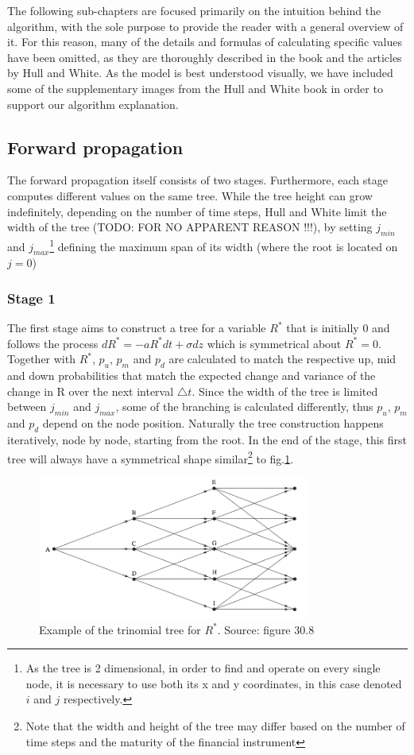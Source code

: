 The following sub-chapters are focused primarily on the intuition behind the algorithm, with the sole purpose to provide the reader with a general overview of it. For this reason, many of the details and formulas of calculating specific values have been omitted, as they are thoroughly described in the book and the articles by Hull and White. As the model is best understood visually, we have included some of the supplementary images from the Hull and White book in order to support our algorithm explanation. 

\subsection{Forward propagation}
The forward propagation itself consists of two stages. Furthermore, each stage computes different values on the same tree. While the tree height can grow indefinitely, depending on the number of time steps, Hull and White limit the width of the tree (TODO: FOR NO APPARENT REASON !!!), by setting $j_{min}$ and $j_{max}$\footnote{As the tree is 2 dimensional, in order to find and operate on every single node, it is necessary to use both its x and y coordinates, in this case denoted $i$ and $j$ respectively.} defining the maximum span of its width (where the root is located on $j=0$)

\subsubsection{Stage 1}
The first stage aims to construct a tree for a variable $R^*$ that is initially 0 and follows the process $dR^*=-aR^*dt + \sigma dz$ which is symmetrical about $R^*=0$\cite[pg.698-699]{ofod}. Together with $R^*$, $p_u$, $p_m$ and $p_d$ are calculated to match the respective up, mid and down probabilities that match the expected change and variance of the change in R over the next interval $\triangle t$. Since the width of the tree is limited between $j_{min}$ and $j_{max}$, some of the branching is calculated differently, thus $p_u$, $p_m$ and $p_d$ depend on the node position. Naturally the tree construction happens iteratively, node by node, starting from the root. In the end of the stage, this first tree will always have a symmetrical shape similar\footnote{Note that the width and height of the tree may differ based on the number of time steps and the maturity of the financial instrument} to fig.\ref{treeconststage1}. 
\begin{figure}[H]
	\centering
	\includegraphics[width=0.8\textwidth]{img/treeconststage1.png}
	\caption{Example of the trinomial tree for $R^*$. Source: figure 30.8 \cite[pg. 699]{ofod}}
	\label{treeconststage1}
\end{figure}

